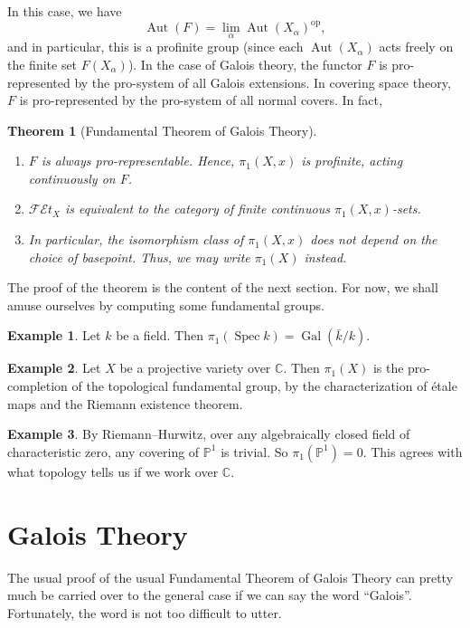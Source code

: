 \documentclass{shortart}
\newtheorem*{thm}{Theorem}
\theoremstyle{definition}
\newtheorem*{eg}{Example}
\renewcommand\P{\mathbb{P}}
\newcommand\C{\mathbb{C}}
\newcommand\op{\mathrm{op}}
\newcommand\FEt[1]{\mathscr{FE}t_{#1}}
\DeclareMathOperator\Gal{Gal}
\DeclareMathOperator\Spec{Spec}
\DeclareMathOperator\Aut{Aut}
\begin{document}
In this case, we have
\[
  \Aut(F) = \lim_\alpha \Aut(X_\alpha)^\op,
\]
and in particular, this is a profinite group (since each $\Aut(X_\alpha)$ acts freely on the finite set $F(X_\alpha)$). In the case of Galois theory, the functor $F$ is pro-represented by the pro-system of all Galois extensions. In covering space theory, $F$ is pro-represented by the pro-system of all normal covers. In fact,
\begin{thm}[Fundamental Theorem of Galois Theory]\leavevmode
  \begin{enumerate}
    \item $F$ is always pro-representable. Hence, $\pi_1(X, x)$ is profinite, acting continuously on $F$.
    \item $\FEt{X}$ is equivalent to the category of finite continuous $\pi_1(X, x)$-sets.
    \item In particular, the isomorphism class of $\pi_1(X, x)$ does not depend on the choice of basepoint. Thus, we may write $\pi_1(X)$ instead.
  \end{enumerate}
\end{thm}
The proof of the theorem is the content of the next section. For now, we shall amuse ourselves by computing some fundamental groups.

\begin{eg}
  Let $k$ be a field. Then $\pi_1(\Spec k) = \Gal(\bar{k}/k)$.
\end{eg}

\begin{eg}
  Let $X$ be a projective variety over $\C$. Then $\pi_1(X)$ is the pro-completion of the topological fundamental group, by the characterization of \'etale maps and the Riemann existence theorem.
\end{eg}

\begin{eg}
  By Riemann--Hurwitz, over any algebraically closed field of characteristic zero, any covering of $\P^1$ is trivial. So $\pi_1(\P^1) = 0$. This agrees with what topology tells us if we work over $\C$.
\end{eg}

\section{Galois Theory}
The usual proof of the usual Fundamental Theorem of Galois Theory can pretty much be carried over to the general case if we can say the word ``Galois''. Fortunately, the word is not too difficult to utter.
\end{document}
